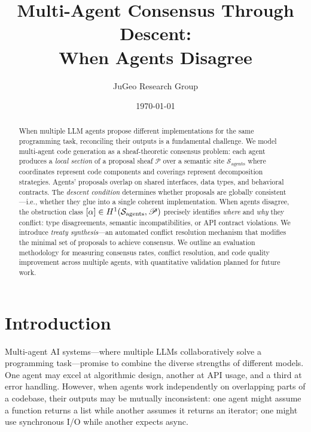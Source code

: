 \documentclass[11pt]{article}
\title{\textbf{Multi-Agent Consensus Through Descent:\\When Agents Disagree}}
\author{JuGeo Research Group}
\date{\today}
\newcommand{\ProposalSheaf}{\mathscr{P}}
\newcommand{\AgentSite}{\mathcal{S}_{\mathrm{agents}}}
\begin{document}
\maketitle

\begin{abstract}
When multiple LLM agents propose different implementations for the same
programming task, reconciling their outputs is a fundamental challenge.
We model multi-agent code generation as a sheaf-theoretic consensus
problem: each agent produces a \emph{local section} of a proposal sheaf
$\ProposalSheaf$ over a semantic site $\AgentSite$ where coordinates
represent code components and coverings represent decomposition
strategies.  Agents' proposals overlap on shared interfaces, data types,
and behavioral contracts.  The \emph{descent condition} determines
whether proposals are globally consistent---i.e., whether they glue into
a single coherent implementation.  When agents disagree, the obstruction
class $[\alpha] \in \Hcoh{1}(\AgentSite, \ProposalSheaf)$ precisely
identifies \emph{where} and \emph{why} they conflict: type
disagreements, semantic incompatibilities, or API contract violations.
We introduce \emph{treaty synthesis}---an automated conflict resolution
mechanism that modifies the minimal set of proposals to achieve
consensus.  We outline an evaluation methodology for measuring consensus rates,
conflict resolution, and code quality improvement across multiple agents,
with quantitative validation planned for future work.
\end{abstract}

\newpage

\section{Introduction}\label{sec:intro}

Multi-agent AI systems---where multiple LLMs collaboratively solve a
programming task---promise to combine the diverse strengths of different
models.  One agent may excel at algorithmic design, another at API
usage, and a third at error handling.  However, when agents work
independently on overlapping parts of a codebase, their outputs may
be mutually inconsistent: one agent might assume a function returns a
list while another assumes it returns an iterator; one might use
synchronous I/O while another expects async.
\end{document}
